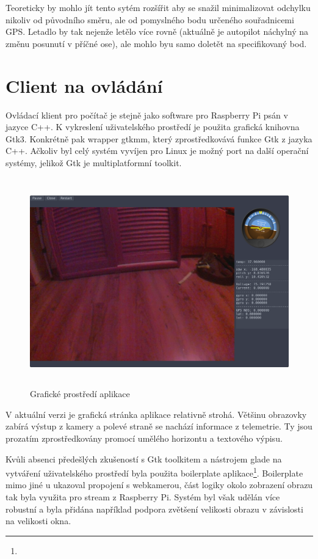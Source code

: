 \documentclass[a4paper,oneside,12pt]{report}
\begin{document}
Teoreticky by mohlo jít tento sytém rozšířit aby se snažil minimalizovat odchylku nikoliv od původního směru, ale od pomyslného bodu určeného souřadnicemi GPS.
Letadlo by tak nejenže letělo více rovně (aktuálně je autopilot náchylný na změnu posunutí v příčné ose), ale mohlo byu samo doletět na specifikovaný bod.


\chapter{Client na ovládání}

Ovládací klient pro počítač je stejně jako software pro Raspberry Pi psán v jazyce C++.
K vykreslení uživatelského prostředí je použita grafická knihovna Gtk3.
Konkrétně pak wrapper gtkmm, který zprostředkovává funkce Gtk z jazyka C++.
Ačkoliv byl celý systém vyvíjen pro Linux je možný port na další operační systémy, jelikož Gtk je multiplatformní toolkit.

\begin{figure}[h]
  \centering
  \includegraphics[height=9cm]{../img/interface.png}
  \caption[Grafické prostředí aplikace]{Grafické prostředí aplikace}
\end{figure}

V aktuální verzi je grafická stránka aplikace relativně strohá.
Většinu obrazovky zabírá výstup z kamery a polevé straně se nachází informace z telemetrie.
Ty jsou prozatím zprostředkovány promocí umělého horizontu a textového výpisu.

Kvůli absenci předešlých zkušeností s Gtk toolkitem a nástrojem glade na vytváření uživatelského prostředí byla použita boilerplate aplikace\footnote{}.
Boilerplate mimo jiné u ukazoval propojení s webkamerou, část logiky okolo zobrazení obrazu tak byla využita pro stream z Raspberry Pi.
Systém byl však udělán více robustní a byla přidána například podpora zvětšení velikosti obrazu v závislosti na velikosti okna.
\end{document}
